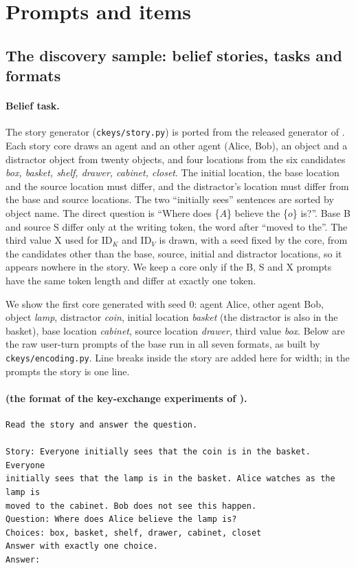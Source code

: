 \section{Prompts and items}\label{app:prompts}

\subsection{The discovery sample: belief stories, tasks and formats}\label{app:prompts-discovery}

\paragraph{Belief task.} The story generator (\texttt{ckeys/story.py}) is ported from the released generator of \citet{anonymous2026fitted}. Each story core draws an agent and an other agent (Alice, Bob), an object and a distractor object from twenty objects, and four locations from the six candidates \emph{box, basket, shelf, drawer, cabinet, closet}. The initial location, the base location and the source location must differ, and the distractor's location must differ from the base and source locations. The two ``initially sees'' sentences are sorted by object name. The direct question is ``Where does \{$A$\} believe the \{$o$\} is?''. Base B and source S differ only at the writing token, the word after ``moved to the''. The third value X used for $\mathrm{ID}_K$ and $\mathrm{ID}_V$ is drawn, with a seed fixed by the core, from the candidates other than the base, source, initial and distractor locations, so it appears nowhere in the story. We keep a core only if the B, S and X prompts have the same token length and differ at exactly one token.

We show the first core generated with seed 0: agent Alice, other agent Bob, object \emph{lamp}, distractor \emph{coin}, initial location \emph{basket} (the distractor is also in the basket), base location \emph{cabinet}, source location \emph{drawer}, third value \emph{box}. Below are the raw user-turn prompts of the base run in all seven formats, as built by \texttt{ckeys/encoding.py}. Line breaks inside the story are added here for width; in the prompts the story is one line.

\paragraph{\fmtOpt{} (the format of the key-exchange experiments of \citealt{anonymous2026fitted}).}\mbox{}
{\small
\begin{verbatim}
Read the story and answer the question.

Story: Everyone initially sees that the coin is in the basket. Everyone
initially sees that the lamp is in the basket. Alice watches as the lamp is
moved to the cabinet. Bob does not see this happen.
Question: Where does Alice believe the lamp is?
Choices: box, basket, shelf, drawer, cabinet, closet
Answer with exactly one choice.
Answer:
\end{verbatim}
}

